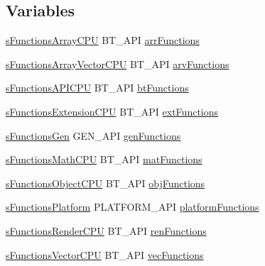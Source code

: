 \subsection*{Variables}
\begin{DoxyCompactItemize}
\item 
\hyperlink{structs_functions_array_c_p_u}{s\-Functions\-Array\-C\-P\-U} B\-T\-\_\-\-A\-P\-I \hyperlink{group__apiinterface_gaba932fc93cbfe8bff149e2a49efcba24}{arr\-Functions}
\item 
\hyperlink{structs_functions_array_vector_c_p_u}{s\-Functions\-Array\-Vector\-C\-P\-U} B\-T\-\_\-\-A\-P\-I \hyperlink{group__apiinterface_ga0068b7c2df330a0f1f8b7237263f2006}{arv\-Functions}
\item 
\hyperlink{structs_functions_a_p_i_c_p_u}{s\-Functions\-A\-P\-I\-C\-P\-U} B\-T\-\_\-\-A\-P\-I \hyperlink{group__apiinterface_ga812b664a0cf0770b180fb24f5ff3688a}{bt\-Functions}
\item 
\hyperlink{structs_functions_extension_c_p_u}{s\-Functions\-Extension\-C\-P\-U} B\-T\-\_\-\-A\-P\-I \hyperlink{group__apiinterface_ga555cf393c703b76e65419d6c52ab2456}{ext\-Functions}
\item 
\hyperlink{structs_functions_gen}{s\-Functions\-Gen} G\-E\-N\-\_\-\-A\-P\-I \hyperlink{group__apiinterface_ga0ad0096fa2e4d581dd2b1980ee256164}{gen\-Functions}
\item 
\hyperlink{structs_functions_math_c_p_u}{s\-Functions\-Math\-C\-P\-U} B\-T\-\_\-\-A\-P\-I \hyperlink{group__apiinterface_gac6191408084585ea75afa43005db8b3e}{mat\-Functions}
\item 
\hyperlink{structs_functions_object_c_p_u}{s\-Functions\-Object\-C\-P\-U} B\-T\-\_\-\-A\-P\-I \hyperlink{group__apiinterface_ga8051be98662f37cbf5b675d8a4e62c7d}{obj\-Functions}
\item 
\hyperlink{structs_functions_platform}{s\-Functions\-Platform} P\-L\-A\-T\-F\-O\-R\-M\-\_\-\-A\-P\-I \hyperlink{group__apiinterface_ga496a50a1c4f5b3f3d99af13d10f9cb7d}{platform\-Functions}
\item 
\hyperlink{structs_functions_render_c_p_u}{s\-Functions\-Render\-C\-P\-U} B\-T\-\_\-\-A\-P\-I \hyperlink{group__apiinterface_ga373b41f071ec933169467de1bda602c4}{ren\-Functions}
\item 
\hyperlink{structs_functions_vector_c_p_u}{s\-Functions\-Vector\-C\-P\-U} B\-T\-\_\-\-A\-P\-I \hyperlink{group__apiinterface_ga0023eeabb63daf422c1dcc0902790729}{vec\-Functions}
\end{DoxyCompactItemize}


